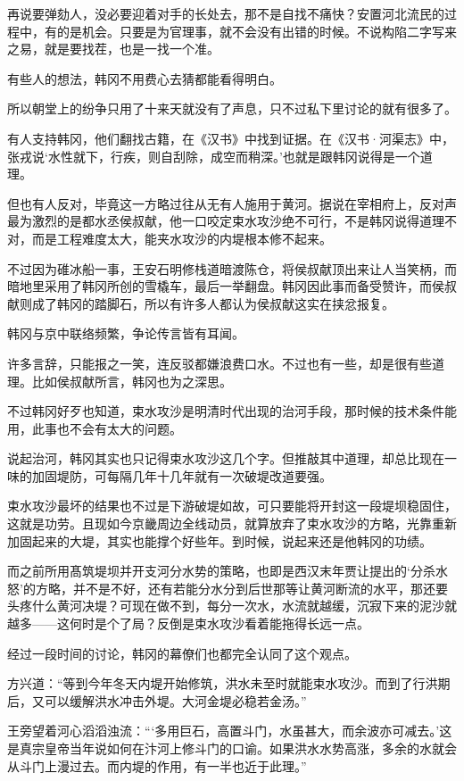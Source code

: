 再说要弹劾人，没必要迎着对手的长处去，那不是自找不痛快？安置河北流民的过程中，有的是机会。只要是为官理事，就不会没有出错的时候。不说构陷二字写来之易，就是要找茬，也是一找一个准。

有些人的想法，韩冈不用费心去猜都能看得明白。

所以朝堂上的纷争只用了十来天就没有了声息，只不过私下里讨论的就有很多了。

有人支持韩冈，他们翻找古籍，在《汉书》中找到证据。在《汉书·河渠志》中，张戎说‘水性就下，行疾，则自刮除，成空而稍深。’也就是跟韩冈说得是一个道理。

但也有人反对，毕竟这一方略过往从无有人施用于黄河。据说在宰相府上，反对声最为激烈的是都水丞侯叔献，他一口咬定束水攻沙绝不可行，不是韩冈说得道理不对，而是工程难度太大，能夹水攻沙的内堤根本修不起来。

不过因为碓冰船一事，王安石明修栈道暗渡陈仓，将侯叔献顶出来让人当笑柄，而暗地里采用了韩冈所创的雪橇车，最后一举翻盘。韩冈因此事而备受赞许，而侯叔献则成了韩冈的踏脚石，所以有许多人都认为侯叔献这实在挟忿报复。

韩冈与京中联络频繁，争论传言皆有耳闻。

许多言辞，只能报之一笑，连反驳都嫌浪费口水。不过也有一些，却是很有些道理。比如侯叔献所言，韩冈也为之深思。

不过韩冈好歹也知道，束水攻沙是明清时代出现的治河手段，那时候的技术条件能用，此事也不会有太大的问题。

说起治河，韩冈其实也只记得束水攻沙这几个字。但推敲其中道理，却总比现在一味的加固堤防，可每隔几年十几年就有一次破堤改道要强。

束水攻沙最坏的结果也不过是下游破堤如故，可只要能将开封这一段堤坝稳固住，这就是功劳。且现如今京畿周边全线动员，就算放弃了束水攻沙的方略，光靠重新加固起来的大堤，其实也能撑个好些年。到时候，说起来还是他韩冈的功绩。

而之前所用髙筑堤坝并开支河分水势的策略，也即是西汉末年贾让提出的‘分杀水怒’的方略，并不是不好，还有若能分水分到后世那等让黄河断流的水平，那还要头疼什么黄河决堤？可现在做不到，每分一次水，水流就越缓，沉寂下来的泥沙就越多——这何时是个了局？反倒是束水攻沙看着能拖得长远一点。

经过一段时间的讨论，韩冈的幕僚们也都完全认同了这个观点。

方兴道：“等到今年冬天内堤开始修筑，洪水未至时就能束水攻沙。而到了行洪期后，又可以缓解洪水冲击外堤。大河金堤必稳若金汤。”

王旁望着河心滔滔浊流：“‘多用巨石，高置斗门，水虽甚大，而余波亦可减去。’这是真宗皇帝当年说如何在汴河上修斗门的口谕。如果洪水水势高涨，多余的水就会从斗门上漫过去。而内堤的作用，有一半也近于此理。”

